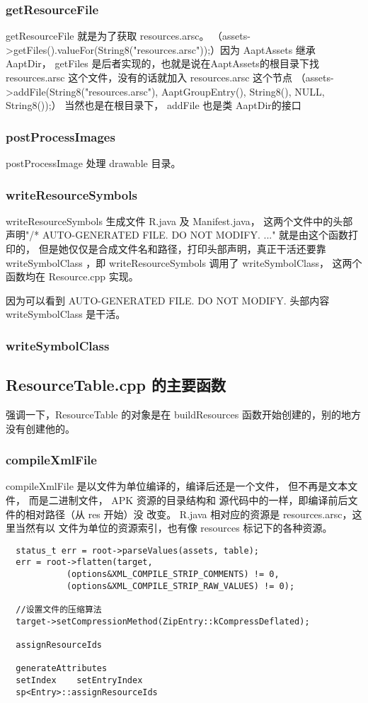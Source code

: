 \documentclass[a4paper,11pt]{article}
\begin{document}
\subsubsection{getResourceFile}
getResourceFile 就是为了获取 resources.arsc。
（assets->getFiles().valueFor(String8("resources.arsc"));）因为 AaptAssets 继承
 AaptDir， getFiles 是后者实现的，也就是说在AaptAssets的根目录下找resources.arsc 
这个文件，没有的话就加入 resources.arsc 这个节点
（assets->addFile(String8("resources.arsc"), AaptGroupEntry(), String8(), NULL, String8());）
当然也是在根目录下， addFile 也是类 AaptDir的接口

\subsubsection{postProcessImages}
postProcessImage 处理 drawable 目录。
\subsubsection{writeResourceSymbols}
	writeResourceSymbols  生成文件 R.java 及 Manifest.java，
这两个文件中的头部声明"/* AUTO-GENERATED FILE.  DO NOT MODIFY. ..."
就是由这个函数打印的，
但是她仅仅是合成文件名和路径，打印头部声明，真正干活还要靠
writeSymbolClass ，即 writeResourceSymbols 调用了 writeSymbolClass，
这两个函数均在 Resource.cpp 实现。

因为可以看到	AUTO-GENERATED FILE.  DO NOT MODIFY.  头部内容
writeSymbolClass 是干活。
\subsubsection{writeSymbolClass}

\subsection{ResourceTable.cpp 的主要函数}
强调一下，ResourceTable 的对象是在 buildResources 函数开始创建的，别的地方
没有创建他的。
\subsubsection{compileXmlFile}
compileXmlFile 是以文件为单位编译的，编译后还是一个文件，
但不再是文本文件， 而是二进制文件， APK 资源的目录结构和
源代码中的一样，即编译前后文件的相对路径（从 res 开始）没
改变。 R.java 相对应的资源是 resources.arsc，这里当然有以
文件为单位的资源索引，也有像 resources 标记下的各种资源。

\begin{lstlisting}
  status_t err = root->parseValues(assets, table);
  err = root->flatten(target,
            (options&XML_COMPILE_STRIP_COMMENTS) != 0,
            (options&XML_COMPILE_STRIP_RAW_VALUES) != 0);
            
  //设置文件的压缩算法
  target->setCompressionMethod(ZipEntry::kCompressDeflated);
        
  assignResourceIds    
   
  generateAttributes
  setIndex    setEntryIndex
  sp<Entry>::assignResourceIds   
\end{lstlisting}
\end{document}
